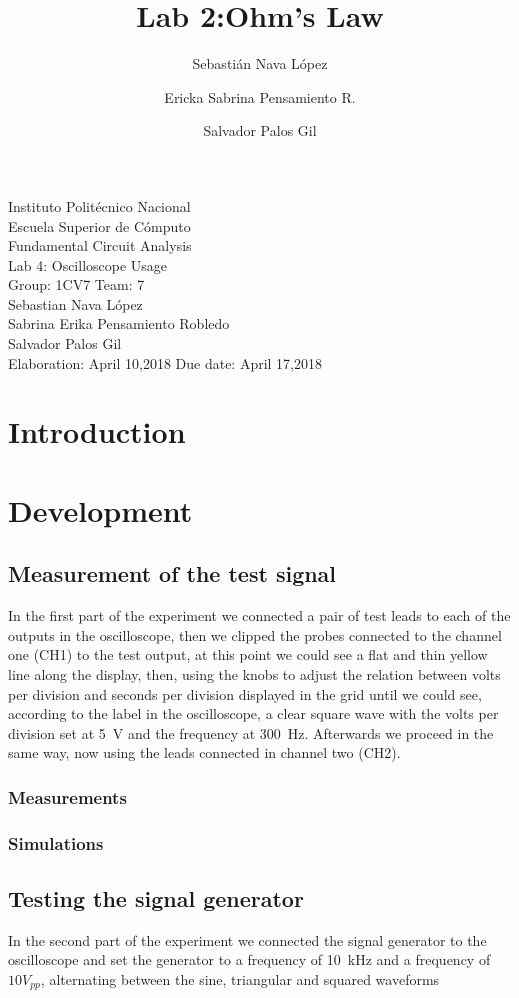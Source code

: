 \documentclass[a4paper]{article}
\title{Lab 2:Ohm's Law}
\author{
    Sebastián Nava López\\
    \and
    Ericka Sabrina Pensamiento R.\\
    \and
    Salvador Palos Gil
}
\begin{document}
\begin{titlepage}
    \centering
    {\Huge Instituto Politécnico Nacional}\\[3ex]
    {\huge Escuela Superior de Cómputo}\\[8ex]
    {\huge Fundamental Circuit Analysis}\\[12ex]
    {\Large Lab 4: Oscilloscope Usage}\\[20ex]
    {\Large Group: 1CV7 Team: 7 \\[8ex]
    Sebastian Nava López\\[4ex]
    Sabrina Erika Pensamiento Robledo\\[4ex]
    Salvador Palos Gil\\[18ex]
    }
    \large{Elaboration: April 10,2018\hspace{8em} Due date: April 17,2018}
\end{titlepage}
\tableofcontents
\newpage
\section{Introduction}
\newpage
\section{Development}
\subsection{Measurement of the test signal}
In the first part of the experiment we connected a pair of test leads to each of the outputs in the
oscilloscope, then we clipped the probes connected to the channel one (CH1) to the test output,
at this point we could see a flat and thin yellow line along the display, then, using the knobs to
adjust the relation between volts per division and seconds per division displayed in the grid until we could see,
according to the label in the oscilloscope, a clear square wave with the volts per division
set at \SI{5}{\volt} and the frequency at \SI{300}{\hertz}. Afterwards we proceed in the same
way, now using the leads connected in channel two (CH2).
\subsubsection{Measurements}
\subsubsection{Simulations}
\subsection{Testing the signal generator}
In the second part of the experiment we connected the signal generator to the oscilloscope and
set the generator to a frequency of \SI{10}{\kilo\hertz} and a frequency of $10 V_{pp}$,
alternating between the sine, triangular and squared waveforms
\end{document}

